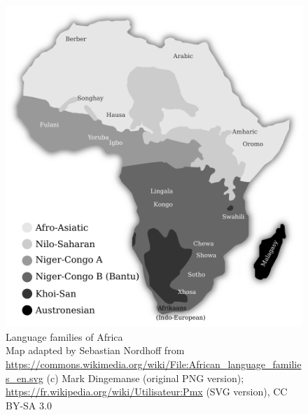 \documentclass[output=paper,hidelinks]{langscibook}
\begin{document}
\begin{figure}[b]
\includegraphics[width=.9\textwidth]{figures/AfricanLanguageFamilies.pdf}
\caption{Language families of Africa\\\tiny Map adapted by Sebastian Nordhoff from \url{https://commons.wikimedia.org/wiki/File:African_language_families_en.svg} (c) Mark Dingemanse (original PNG version); \href{Pmx}{https://fr.wikipedia.org/wiki/Utilisateur:Pmx} (SVG version), CC BY-SA 3.0}
\label{fig:African:1}
\end{figure}
\end{document}
